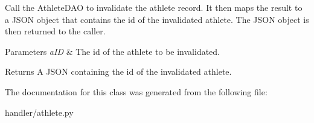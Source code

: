 Call the Athlete\+D\+AO to invalidate the athlete record. It then maps the result to a J\+S\+ON object that contains the id of the invalidated athlete. The J\+S\+ON object is then returned to the caller.


\begin{DoxyParams}{Parameters}
{\em a\+ID} & The id of the athlete to be invalidated. \\
\hline
\end{DoxyParams}
\begin{DoxyReturn}{Returns}
A J\+S\+ON containing the id of the invalidated athlete. 
\end{DoxyReturn}


The documentation for this class was generated from the following file\+:\begin{DoxyCompactItemize}
\item 
handler/athlete.\+py\end{DoxyCompactItemize}
